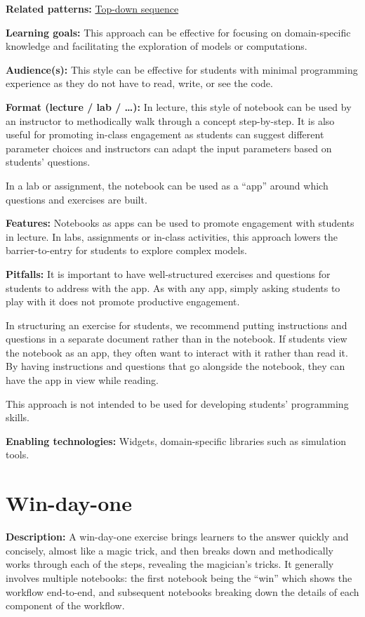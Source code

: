 \documentclass[]{book}
\begin{document}
\textbf{Related patterns:}
\protect\hyperlink{top-down-sequence}{Top-down sequence}

\textbf{Learning goals:} This approach can be effective for focusing on
domain-specific knowledge and facilitating the exploration of models or
computations.

\textbf{Audience(s):} This style can be effective for students with
minimal programming experience as they do not have to read, write, or
see the code.

\textbf{Format (lecture / lab / \ldots{}):} In lecture, this style of
notebook can be used by an instructor to methodically walk through a
concept step-by-step. It is also useful for promoting in-class
engagement as students can suggest different parameter choices and
instructors can adapt the input parameters based on students' questions.

In a lab or assignment, the notebook can be used as a ``app'' around
which questions and exercises are built.

\textbf{Features:} Notebooks as apps can be used to promote engagement
with students in lecture. In labs, assignments or in-class activities,
this approach lowers the barrier-to-entry for students to explore
complex models.

\textbf{Pitfalls:} It is important to have well-structured exercises and
questions for students to address with the app. As with any app, simply
asking students to play with it does not promote productive engagement.

In structuring an exercise for students, we recommend putting
instructions and questions in a separate document rather than in the
notebook. If students view the notebook as an app, they often want to
interact with it rather than read it. By having instructions and
questions that go alongside the notebook, they can have the app in view
while reading.

This approach is not intended to be used for developing students'
programming skills.

\textbf{Enabling technologies:} Widgets, domain-specific libraries such
as simulation tools.

\hypertarget{win-day-one}{\section{Win-day-one}\label{win-day-one}}

\textbf{Description:} A win-day-one exercise brings learners to the
answer quickly and concisely, almost like a magic trick, and then breaks
down and methodically works through each of the steps, revealing the
magician's tricks. It generally involves multiple notebooks: the first
notebook being the ``win'' which shows the workflow end-to-end, and
subsequent notebooks breaking down the details of each component of the
workflow.
\end{document}
